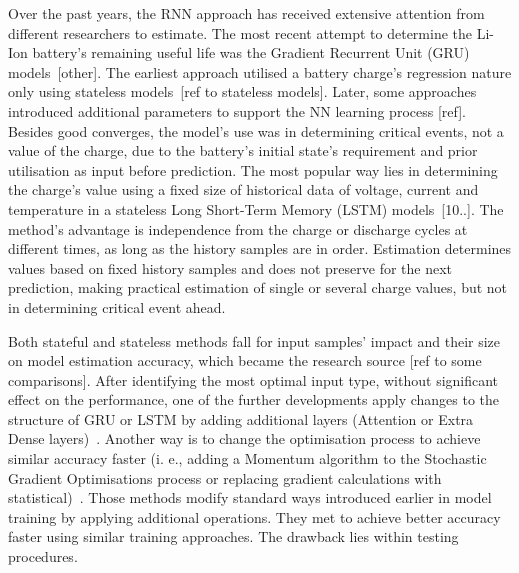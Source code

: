 %
%
Over the past years, the RNN approach has received extensive attention from different researchers to estimate.
The most recent attempt to determine the Li-Ion battery's remaining useful life was the Gradient Recurrent Unit (GRU) models~\cite{song_lithium-ion_2018}[other].
The earliest approach utilised a battery charge's regression nature only using stateless models~\cite{song_lithium-ion_2018}[ref to stateless models].
Later, some approaches introduced additional parameters to support the NN learning process [ref].
Besides good converges, the model's use was in determining critical events, not a value of the charge, due to the battery's initial state's requirement and prior utilisation as input before prediction.
The most popular way lies in determining the charge's value using a fixed size of historical data of voltage, current and temperature in a stateless Long Short-Term Memory (LSTM) models~\cite{Chemali2017}[10..].
The method's advantage is independence from the charge or discharge cycles at different times, as long as the history samples are in order.
Estimation determines values based on fixed history samples and does not preserve for the next prediction, making practical estimation of single or several charge values, but not in determining critical event ahead.

%
%
Both stateful and stateless methods fall for input samples' impact and their size on model estimation accuracy, which became the research source [ref to some comparisons].
After identifying the most optimal input type, without significant effect on the performance, one of the further developments apply changes to the structure of GRU or LSTM by adding additional layers (Attention or Extra Dense layers)~\cite{mamo_long_2020, jiao_gru-rnn_2020}.
Another way is to change the optimisation process to achieve similar accuracy faster (i. e., adding a Momentum algorithm to the Stochastic Gradient Optimisations process or replacing gradient calculations with statistical)~\cite{xiao_accurate_2019, javid_adaptive_2020}.
Those methods modify standard ways introduced earlier in model training by applying additional operations.
They met to achieve better accuracy faster using similar training approaches.
The drawback lies within testing procedures.

